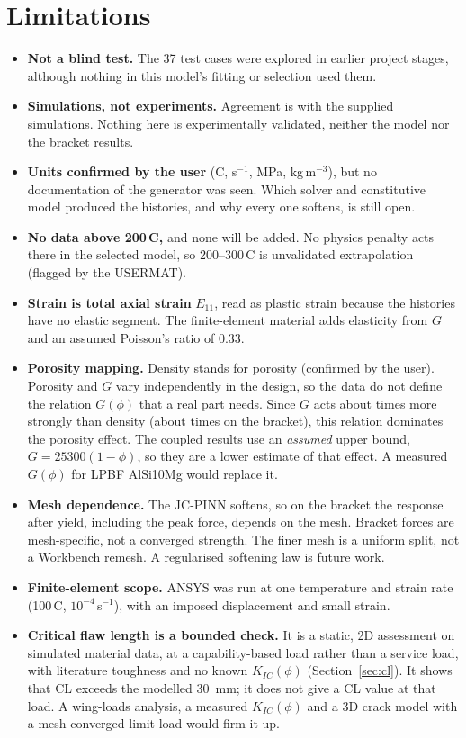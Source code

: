 \documentclass[11pt,a4paper]{article}
\begin{document}
\section{Limitations}
\begin{itemize}
\item \textbf{Not a blind test.} The 37 test cases were explored in earlier project stages, although nothing in this model's fitting or selection used them.
\item \textbf{Simulations, not experiments.} Agreement is with the supplied simulations. Nothing here is experimentally validated, neither the model nor the bracket results.
\item \textbf{Units confirmed by the user} (\textdegree C, s$^{-1}$, MPa, kg\,m$^{-3}$), but no documentation of the generator was seen. Which solver and constitutive model produced the histories, and why every one softens, is still open.
\item \textbf{No data above 200\,\textdegree C,} and none will be added. No physics penalty acts there in the selected model, so 200--300\,\textdegree C is unvalidated extrapolation (flagged by the USERMAT).
\item \textbf{Strain is total axial strain} $E_{11}$, read as plastic strain because the histories have no elastic segment. The finite-element material adds elasticity from $G$ and an assumed Poisson's ratio of 0.33.
\item \textbf{Porosity mapping.} Density stands for porosity (confirmed by the user). Porosity and $G$ vary independently in the design, so the data do not define the relation $G(\phi)$ that a real part needs. Since $G$ acts about \nPorRatio{} times more strongly than density (about \nPorBrGOverDens{} times on the bracket), this relation dominates the porosity effect. The coupled results use an \emph{assumed} upper bound, $G=25300(1-\phi)$, so they are a lower estimate of that effect. A measured $G(\phi)$ for LPBF AlSi10Mg would replace it.
\item \textbf{Mesh dependence.} The JC-PINN softens, so on the bracket the response after yield, including the peak force, depends on the mesh. Bracket forces are mesh-specific, not a converged strength. The finer mesh is a uniform split, not a Workbench remesh. A regularised softening law is future work.
\item \textbf{Finite-element scope.} ANSYS was run at one temperature and strain rate (100\,\textdegree C, $10^{-4}$\,s$^{-1}$), with an imposed displacement and small strain.
\item \textbf{Critical flaw length is a bounded check.} It is a static, 2D assessment on simulated material data, at a capability-based load rather than a service load, with literature toughness and no known $K_{IC}(\phi)$ (Section~\ref{sec:cl}). It shows that CL exceeds the modelled 30~mm; it does not give a CL value at that load. A wing-loads analysis, a measured $K_{IC}(\phi)$ and a 3D crack model with a mesh-converged limit load would firm it up.

\end{itemize}
\end{document}
